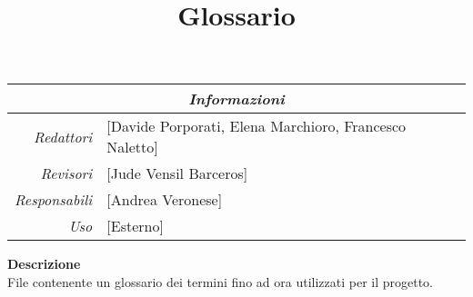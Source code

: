 \documentclass[12pt]{article}
\begin{document}
\graphicspath{ {../templates/img/} }

\title{Glossario}

\firstPage

\maketitle

\begin{center}
    \begin{tabular}{r | l}
		\multicolumn{2}{c}{\textit{Informazioni}}\\
		\hline
		
			\textit{Redattori} &
			[Davide Porporati, Elena Marchioro, Francesco Naletto]\makecell{}\\

			\textit{Revisori} &
			[Jude Vensil Barceros]\makecell{}\\
			\textit{Responsabili} &
			[Andrea Veronese]\makecell{}\\
		      \textit{Uso} & 
                [Esterno]\makecell{}\\
    \end{tabular}
\end{center}

\begin{center}
    \textbf{Descrizione}\\
    File contenente un glossario dei termini fino ad ora utilizzati per il progetto.
\end{center}

\pagebreak

\tableofcontents
\pagebreak

\printindex 


\makeversioni
\end{document}
